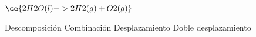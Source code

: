 $\ce{2H2O(l) -> 2H2(g) + O2(g)}$

\begin{choices}
    \CorrectChoice Descomposición
    \choice Combinación
    \choice Desplazamiento
    \choice Doble desplazamiento
\end{choices}